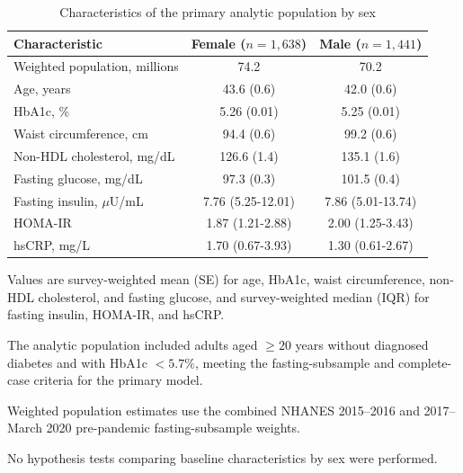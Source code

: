 \begin{table}[htbp]
\centering
\caption{Characteristics of the primary analytic population by sex}
\label{tab:table1}
\begin{threeparttable}
\begin{tabular}{lcc}
\toprule
Characteristic & Female ($n=1,638$) & Male ($n=1,441$) \\
\midrule
Weighted population, millions & 74.2 & 70.2 \\
Age, years & 43.6 (0.6) & 42.0 (0.6) \\
HbA1c, \% & 5.26 (0.01) & 5.25 (0.01) \\
Waist circumference, cm & 94.4 (0.6) & 99.2 (0.6) \\
Non-HDL cholesterol, mg/dL & 126.6 (1.4) & 135.1 (1.6) \\
Fasting glucose, mg/dL & 97.3 (0.3) & 101.5 (0.4) \\
Fasting insulin, $\mu$U/mL & 7.76 (5.25-12.01) & 7.86 (5.01-13.74) \\
HOMA-IR & 1.87 (1.21-2.88) & 2.00 (1.25-3.43) \\
hsCRP, mg/L & 1.70 (0.67-3.93) & 1.30 (0.61-2.67) \\
\bottomrule
\end{tabular}
\begin{tablenotes}[flushleft]
\footnotesize
\item Values are survey-weighted mean (SE) for age, HbA1c, waist circumference, non-HDL cholesterol, and fasting glucose, and survey-weighted median (IQR) for fasting insulin, HOMA-IR, and hsCRP.
\item The analytic population included adults aged $\geq20$ years without diagnosed diabetes and with HbA1c $<5.7\%$, meeting the fasting-subsample and complete-case criteria for the primary model.
\item Weighted population estimates use the combined NHANES 2015--2016 and 2017--March 2020 pre-pandemic fasting-subsample weights.
\item No hypothesis tests comparing baseline characteristics by sex were performed.
\end{tablenotes}
\end{threeparttable}
\end{table}